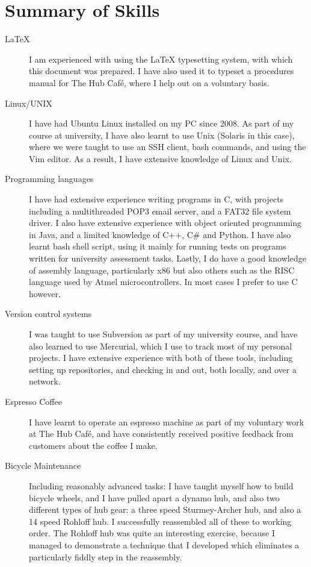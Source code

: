 \documentclass[a4paper]{article}
\begin{document}
\section{Summary of Skills}
\begin{description}
    \item[\LaTeX{}] I am experienced with using the \LaTeX{} typesetting
        system, with which this document was prepared. I have also used
        it to typeset a procedures manual for The Hub Caf\'e, where I
        help out on a voluntary basis.
    \item[Linux/UNIX] I have had Ubuntu Linux installed on my PC since
        2008. As part of my course at university, I have also learnt to
        use Unix (Solaris in this case), where we were taught to use an
        SSH client, bash commands, and using the Vim editor. As a result,
        I have extensive knowledge of Linux and Unix.
    \item[Programming languages] I have had extensive experience writing
        programs in C, with projects including a multithreaded POP3 email 
        server, and a FAT32 file system driver. I also have extensive
        experience with object oriented programming in Java, and a limited
        knowledge of C++, C\# and Python. I have also learnt
        bash shell script, using it mainly for running tests on programs
        written for university assessment tasks. Lastly, I do have a good
        knowledge of assembly language, particularly x86 but also others
        such as the RISC language used by Atmel microcontrollers. In most
        cases I prefer to use C however.
    \item[Version control systems] I was taught to use Subversion as part
        of my university course, and have also learned to use Mercurial,
        which I use to track most of my personal projects. I have extensive
        experience with both of these tools, including setting up
        repositories, and checking in and out, both locally, and over a
        network.
    \item[Espresso Coffee] I have learnt to operate an espresso machine as
        part of my voluntary work at The Hub Caf\'e, and have consistently
        received positive feedback from customers about the coffee I make.
    \item[Bicycle Maintenance] Including reasonably advanced tasks: I have
        taught myself how to build bicycle wheels, and I have pulled
        apart a dynamo hub, and also two different types of hub gear: a
        three speed Sturmey-Archer hub, and also a 14 speed Rohloff hub.
        I successfully reassembled all of these to working order. The
        Rohloff hub was quite an interesting exercise, because I managed
        to demonstrate a technique that I developed which eliminates a
        particularly fiddly step in the reassembly.
\end{description}
\end{document}
